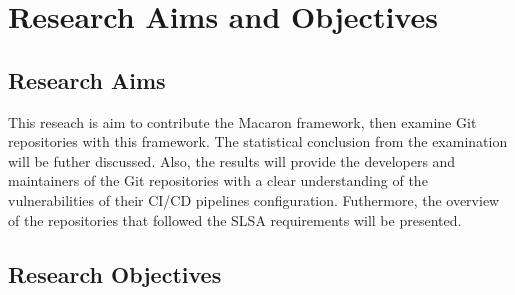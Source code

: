 \section{Research Aims and Objectives}

\subsection{Research Aims}
This reseach is aim to contribute the Macaron framework, then examine Git repositories
with this framework. The statistical conclusion from the examination will be futher 
discussed. Also, the results will provide the developers and maintainers of the Git 
repositories with a clear understanding of the vulnerabilities of their CI/CD pipelines
configuration. Futhermore, the overview of the repositories that followed the SLSA requirements
will be presented.

\subsection{Research Objectives}